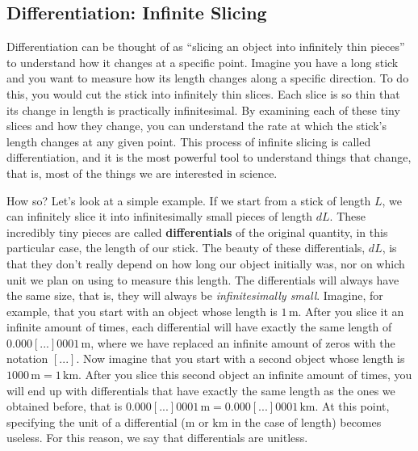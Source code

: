 \documentclass[
  9pt,
]{extbook}
\theoremstyle{definition}
\theoremstyle{definition}
\theoremstyle{definition}
\theoremstyle{remark}
\begin{document}
\hypertarget{infslici}{%
\subsection{Differentiation: Infinite Slicing}\label{infslici}}

Differentiation can be thought of as ``slicing an object into infinitely thin pieces'' to understand how it changes at a specific point. Imagine you have a long stick and you want to measure how its length changes along a specific direction. To do this, you would cut the stick into infinitely thin slices. Each slice is so thin that its change in length is practically infinitesimal. By examining each of these tiny slices and how they change, you can understand the rate at which the stick's length changes at any given point. This process of infinite slicing is called differentiation, and it is the most powerful tool to understand things that change, that is, most of the things we are interested in science.

How so? Let's look at a simple example. If we start from a stick of length \(L\), we can infinitely slice it into infinitesimally small pieces of length \(dL\). These incredibly tiny pieces are called \textbf{differentials} of the original quantity, in this particular case, the length of our stick. The beauty of these differentials, \(dL\), is that they don't really depend on how long our object initially was, nor on which unit we plan on using to measure this length. The differentials will always have the same size, that is, they will always be \emph{infinitesimally small}. Imagine, for example, that you start with an object whose length is \(1\, \text{m}\). After you slice it an infinite amount of times, each differential will have exactly the same length of \(0.000[...]0001\, \text{m}\), where we have replaced an infinite amount of zeros with the notation \([...]\). Now imagine that you start with a second object whose length is \(1000\, \text{m} = 1\,\text{km}\). After you slice this second object an infinite amount of times, you will end up with differentials that have exactly the same length as the ones we obtained before, that is \(0.000[...]0001\, \text{m} = 0.000[...]0001\, \text{km}\). At this point, specifying the unit of a differential (\(\text{m}\) or \(\text{km}\) in the case of length) becomes useless. For this reason, we say that differentials are unitless.
\end{document}
